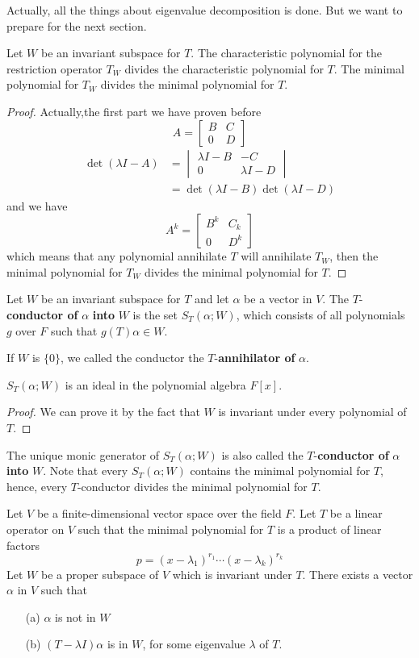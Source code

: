 \documentclass{article}
\begin{document}
\indent Actually, all the things about eigenvalue decomposition is done. But we want to prepare for the next section.
\begin{lem}
	Let $W$ be an invariant subspace for $T$. The characteristic polynomial for the restriction operator $T_W$ divides the characteristic polynomial for $T$. The minimal polynomial for $T_W$ divides the minimal polynomial for $T$.
\end{lem}
\begin{proof}
	Actually,the first part we have proven before
	\[A=\begin{bmatrix}
		B&C\\
		0&D
	\end{bmatrix}\]
	\begin{align*}
		\det(\lambda I-A)&=\begin{vmatrix}
			\lambda I-B&-C\\
			0&\lambda I-D
		\end{vmatrix}\\
		&=\det(\lambda I-B)\det(\lambda I-D)
	\end{align*}
	and we have
	\[A^k=\begin{bmatrix}
		B^k&C_k\\
		0&D^k
	\end{bmatrix}\]
	which means that any polynomial annihilate $T$ will annihilate $T_W$, then the minimal polynomial for $T_W$ divides the minimal polynomial for $T$. 
\end{proof}
\begin{dde}
	Let $W$ be an invariant subspace for $T$ and let $\alpha$ be a vector in $V$. The $T$-\textbf{conductor of} $\alpha$ \textbf{into} $W$ is the set $S_T(\alpha;W)$, which consists of all polynomials $g$ over $F$ such that $g(T)\alpha\in W$.
\end{dde}
If $W$ is $\{0\}$, we called the conductor the $T$-\textbf{annihilator of} $\alpha$.
\begin{lem}
	$S_T(\alpha;W)$ is an ideal in the polynomial algebra $F[x]$.
\end{lem}
\begin{proof}
	We can prove it by the fact that $W$ is invariant under every polynomial of $T$.  
\end{proof}
The unique monic generator of $S_T(\alpha;W)$ is also called the $T$-\textbf{conductor of} $\alpha$ \textbf{into} $W$. Note that every $S_T(\alpha;W)$ contains the minimal polynomial for $T$, hence, every $T$-conductor divides the minimal polynomial for $T$.
\begin{lem}
	Let $V$ be a finite-dimensional vector space over the field $F$. Let $T$ be a linear operator on $V$ such that the minimal polynomial for $T$ is a product of linear factors
	\[p=(x-\lambda_1)^{r_1}\cdots(x-\lambda_k)^{r_k}\]
	Let $W$ be a proper subspace of $V$ which is invariant under $T$. There exists a vector $\alpha$ in $V$ such that
	\begin{enumerate}
		\item [(a)]$\alpha$ is not in $W$
		\item [(b)]$(T-\lambda I)\alpha$ is in $W$, for some eigenvalue $\lambda$ of $T$.
	\end{enumerate}
\end{lem}
\end{document}
